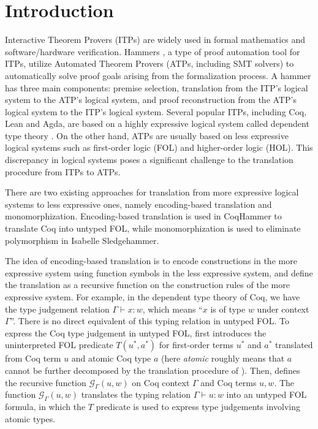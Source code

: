 \section{Introduction}

  Interactive Theorem Provers (ITPs)\cite{Harrison2014HistoryOI}
  are widely used in formal mathematics and software/hardware verification. Hammers
  \cite{Blanchette2016HammeringTQ}\cite{Czajka2018HammerFC}, a type of proof automation tool for
  ITPs, utilize Automated Theorem Provers (ATPs, including SMT solvers) to automatically solve proof goals
  arising from the formalization process. A hammer has three main components:
  premise selection, translation from the ITP's logical system to the ATP's
  logical system, and proof reconstruction from the ATP's logical system to
  the ITP's logical system. Several popular ITPs, including
  Coq\cite{CoqRefMan}, Lean\cite{Lean4} and Agda\cite{Agda},
  are based on a highly expressive logical system called dependent type theory \cite{Coquand1988}.
  On the other hand, ATPs are usually based on less expressive logical systems such
  as first-order logic (FOL) and higher-order logic (HOL). This discrepancy in
  logical systems poses a significant challenge to the translation procedure from
  ITPs to ATPs.

  There are two existing approaches for translation from more expressive
  logical systems to less expressive ones, namely encoding-based translation and monomorphization.
  Encoding-based translation is used in CoqHammer\cite{Czajka2018HammerFC}
  to translate Coq into untyped FOL, while monomorphization is used to
  eliminate polymorphism in Isabelle Sledgehammer\cite{Blanchette2016HammeringTQ}\cite{Paulson2012ThreeYO}.
  
  The idea of encoding-based translation is to encode
  constructions in the more expressive system using function symbols in the less
  expressive system, and define the translation as a recursive function on the construction
  rules of the more expressive system. For example, in the dependent type theory of Coq,
  we have the type judgement relation $\Gamma \vdash x : w$, which means ``$x$ is of
  type $w$ under context $\Gamma$''. There is no direct equivalent of this
  typing relation in untyped FOL. To express the Coq type judgement in untyped FOL, 
  \cite{Czajka2018HammerFC} first introduces the uninterpreted FOL predicate $T(u^*, a^*)$ for
  first-order terms $u^*$ and $a^*$ translated from Coq term $u$ and atomic Coq type $a$
  (here \textit{atomic} roughly means that $a$ cannot be
  further decomposed by the translation procedure of \cite{Czajka2018HammerFC}). Then, \cite{Czajka2018HammerFC}
  defines the recursive function $\mathcal{G}_\Gamma(u, w)$ on Coq context $\Gamma$ and Coq terms $u, w$.
  The function $\mathcal{G}_\Gamma(u, w)$ translates the typing relation $\Gamma \vdash u : w$ into an untyped FOL formula,
  in which the $T$ predicate is used to express type judgements involving atomic types.
  
